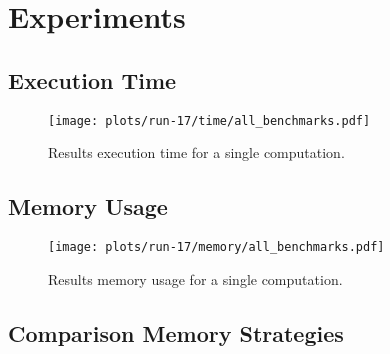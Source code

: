 \chapter{Experiments}

\section{Execution Time}

\begin{figure}[H]
  \centering
  \texttt{[image: plots/run-17/time/all\_benchmarks.pdf]}  
  \caption{Results execution time for a single computation.}
  \label{fig-bench-execution-time}
\end{figure}

\section{Memory Usage}
\begin{figure}[H]
  \centering
  \texttt{[image: plots/run-17/memory/all\_benchmarks.pdf]}
  \caption{Results memory usage for a single computation.}
  \label{fig-bench-memory-usage}
\end{figure}

\section{Comparison Memory Strategies}